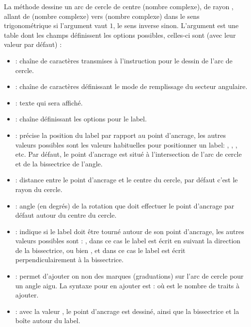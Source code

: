 La méthode  dessine un arc de cercle de centre  (nombre complexe), de rayon , allant de  (nombre complexe) vers  (nombre complexe) dans le sens trigonométrique si l'argument  vaut $1$, le sens inverse sinon. L'argument  est une table dont les champs définissent les options possibles, celles-ci sont (avec leur valeur par défaut) :
\begin{itemize}
    \item {} : chaîne de caractères transmises à l'instruction \drawcmd pour le dessin de l'arc de cercle.
    \item {} : chaîne de caractères définissant le mode de remplissage du secteur angulaire.
    \item {} : texte qui sera affiché.
    \item {} : chaîne définissant les options pour le label.
    \item {} : précise la position du label par rapport au point d'ancrage, les autres valeurs possibles sont les valeurs habituelles pour positionner un label: , , , etc. Par défaut, le point d'ancrage est situé à l'intersection de l'arc de cercle et de la bissectrice de l'angle.
    \item {} : distance entre le point d'ancrage et le centre du cercle, par défaut c'est le rayon  du cercle.
    \item {} : angle (en degrés) de la rotation que doit effectuer le point d'ancrage par défaut autour du centre du cercle.
    \item {} : indique si le label doit être tourné autour de son point d'ancrage, les autres valeurs possibles sont : , dans ce cas le label est écrit en suivant la direction de la bissectrice, ou bien , et dans ce cas le label est écrit perpendiculairement à la bissectrice.
    \item {} : permet d'ajouter on non des marques (graduations) sur l'arc de cercle pour un angle aigu. La syntaxe pour en ajouter est :  où  est le nombre de traits à ajouter.
    \item {} : avec la valeur \true, le point d'ancrage est dessiné, ainsi que la bissectrice et la boîte autour du label.
\end{itemize}

